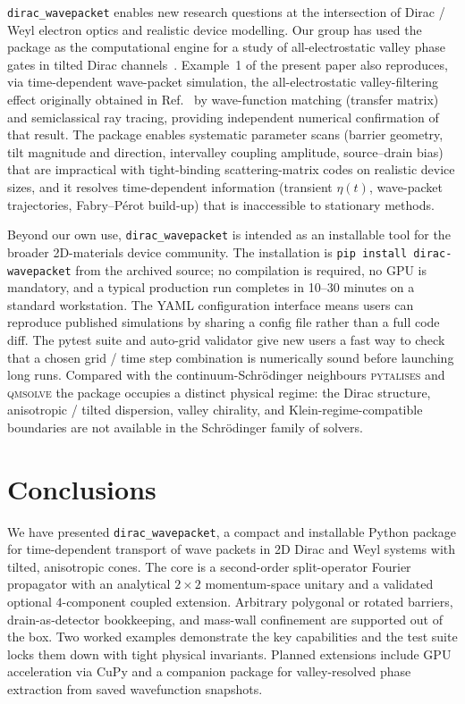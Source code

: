\documentclass[preprint, 12pt, a4paper]{elsarticle}
\newcommand{\dirac}{\texttt{dirac\_wavepacket}\xspace}
\begin{document}
\dirac enables new research questions at the intersection of Dirac /
Weyl electron optics and realistic device modelling. Our group has
used the package as the computational engine for a study of
all-electrostatic valley phase gates in tilted Dirac
channels~\cite{Yesilyurt2026phasegate}. Example~1 of the present
paper also reproduces, via time-dependent wave-packet simulation,
the all-electrostatic valley-filtering effect originally obtained in
Ref.~\cite{Yesilyurt2026valleyfilter} by wave-function matching
(transfer matrix) and semiclassical ray tracing, providing
independent numerical confirmation of that result. The package
enables systematic parameter scans (barrier geometry, tilt magnitude
and direction, intervalley coupling amplitude, source--drain bias)
that are impractical with tight-binding scattering-matrix codes on
realistic device sizes, and it resolves time-dependent information
(transient $\eta(t)$, wave-packet trajectories, Fabry--Pérot
build-up) that is inaccessible to stationary methods.

Beyond our own use, \dirac is intended as an installable tool for
the broader 2D-materials device community. The installation is
\texttt{pip install dirac-wavepacket} from the archived source; no compilation
is required, no GPU is mandatory, and a typical production run
completes in 10--30 minutes on a standard workstation. The YAML
configuration interface means users can reproduce published
simulations by sharing a config file rather than a full code diff.
The pytest suite and auto-grid validator give new users a fast way
to check that a chosen grid / time step combination is numerically
sound before launching long runs. Compared with the
continuum-Schr\"odinger neighbours \textsc{pytalises}
\cite{pytalises} and \textsc{qmsolve} \cite{qmsolve} the package
occupies a distinct physical regime: the Dirac structure,
anisotropic / tilted dispersion, valley chirality, and
Klein-regime-compatible boundaries are not available in the
Schr\"odinger family of solvers.

\section{Conclusions}
\label{sec:conclusions}

We have presented \dirac, a compact and installable Python package
for time-dependent transport of wave packets in 2D Dirac and Weyl
systems with tilted, anisotropic cones. The core is a second-order
split-operator Fourier propagator with an analytical $2\times2$
momentum-space unitary and a validated optional $4$-component
coupled extension. Arbitrary polygonal or rotated barriers,
drain-as-detector bookkeeping, and mass-wall confinement are
supported out of the box. Two worked examples demonstrate the
key capabilities and the test suite locks them down with tight
physical invariants. Planned extensions include GPU acceleration via
CuPy and a companion package for valley-resolved phase extraction
from saved wavefunction snapshots.
\end{document}
